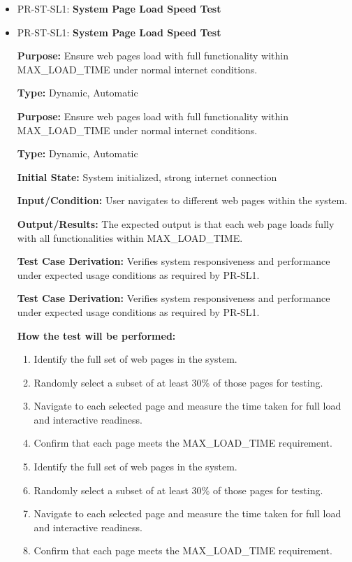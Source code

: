 \documentclass[12pt, titlepage]{article}
\begin{document}
\begin{itemize}
  \item PR-ST-SL1: \textbf{System Page Load Speed Test}
  \item PR-ST-SL1: \textbf{System Page Load Speed Test}
  \begin{mdframed}[linewidth=0.5mm]
      \textbf{Purpose:} Ensure web pages load with full functionality within MAX\_LOAD\_TIME under normal internet conditions. \par
      \textbf{Type:} Dynamic, Automatic\par
      \textbf{Purpose:} Ensure web pages load with full functionality within MAX\_LOAD\_TIME under normal internet conditions. \par
      \textbf{Type:} Dynamic, Automatic\par
      \textbf{Initial State:} System initialized, strong internet connection \par
      \textbf{Input/Condition:} User navigates to different web pages within the system. \par
      \textbf{Output/Results:} The expected output is that each web page loads fully with all functionalities within MAX\_LOAD\_TIME. \par
      \textbf{Test Case Derivation:} Verifies system responsiveness and performance under expected usage conditions as required by PR-SL1. \par
      \textbf{Test Case Derivation:} Verifies system responsiveness and performance under expected usage conditions as required by PR-SL1. \par
      \textbf{How the test will be performed:}
      \begin{enumerate}[noitemsep]
        \item Identify the full set of web pages in the system.
        \item Randomly select a subset of at least 30\% of those pages for testing.
        \item Navigate to each selected page and measure the time taken for full load and interactive readiness.
        \item Confirm that each page meets the MAX\_LOAD\_TIME requirement.
        \item Identify the full set of web pages in the system.
        \item Randomly select a subset of at least 30\% of those pages for testing.
        \item Navigate to each selected page and measure the time taken for full load and interactive readiness.
        \item Confirm that each page meets the MAX\_LOAD\_TIME requirement.
      \end{enumerate}
  \end{mdframed}


\end{itemize}
\end{document}
